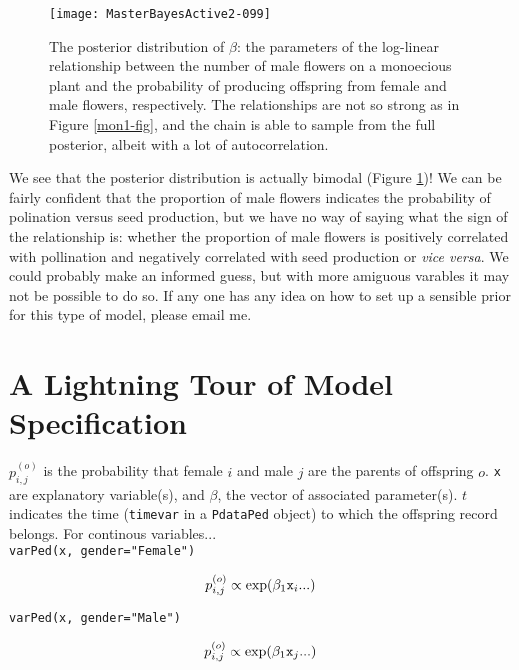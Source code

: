 \documentclass{article}
\begin{document}
\begin{figure}[!h]
\begin{center}
\texttt{[image: MasterBayesActive2-099]}
\end{center}
\caption{The posterior distribution of $\beta$: the parameters of the log-linear relationship between the number of male flowers on a monoecious plant and the probability of producing offspring from female and male flowers, respectively. The relationships are not so strong as in Figure \ref{mon1-fig}, and the chain is able to sample from the full posterior, albeit with a lot of autocorrelation.}
\label{mon2-fig}
\end{figure}

We see that the posterior distribution is actually bimodal (Figure \ref{mon2-fig})! We can be fairly confident that the proportion of male flowers indicates the probability of polination versus seed production, but we have no way of saying what the sign of the relationship is: whether the proportion of male flowers is positively correlated with pollination and negatively correlated with seed production or \emph{vice versa}.  We could probably make an informed guess, but with more amiguous varables it may not be possible to do so.  If any one has any idea on how to set up a sensible prior for this type of model, please email me.  


\appendix
\section{A Lightning Tour of Model Specification}
\label{models-app}

$p^{(o)}_{i,j}$ is the probability that female $i$ and male $j$ are the parents of offspring $o$. \texttt{x} are explanatory variable(s), and $\beta$, the vector of associated parameter(s). $t$ indicates the time (\texttt{timevar} in a \texttt{PdataPed} object) to which the offspring record belongs.  For continous variables...\\

\texttt{varPed(x, gender="Female")}

\begin{equation}
p^{(o)}_{i,j} \propto \textrm{exp}(\beta_{1}\textrm{\texttt{x}}_{i}...)
\end{equation}

\texttt{varPed(x, gender="Male")}

\begin{equation}
p^{(o)}_{i,j} \propto \textrm{exp}(\beta_{1}\textrm{\texttt{x}}_{j}...)
\end{equation}
\end{document}
